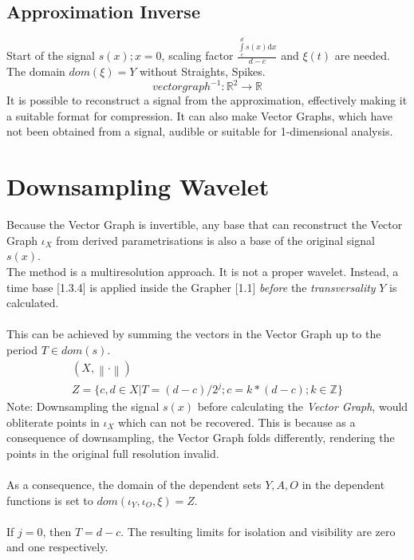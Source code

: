 \documentclass{report}
\newcommand\norm[1]{\left\lVert#1\right\rVert}
\begin{document}
\section{Approximation Inverse}
Start of the signal $s(x);x=0$, scaling factor $\frac{\int \limits _{c}^{d}s(x)\mathrm{d}x}{d-c}$ and $\xi(t)$ are needed. The domain $dom(\xi)=Y$ without Straights, Spikes.
\begin{equation}
vectorgraph^{-1}: \mathbb{R}^2 \rightarrow \mathbb{R}
\end{equation}
It is possible to reconstruct a signal from the approximation, effectively making it a suitable format for compression. It can also make Vector Graphs, which have not been obtained from a signal, audible or suitable for 1-dimensional analysis.

\chapter{Downsampling Wavelet}
Because the Vector Graph is invertible, any base that can reconstruct the Vector Graph $\iota_{X}$ from derived parametrisations is also a base of the original signal $s(x)$.\\
The method is a multiresolution approach. It is not a proper wavelet. Instead, a time base \cite{Mallat}[1.3.4] is applied inside the Grapher \cite{Stopeight}[1.1] \emph{before} the \emph{transversality} $Y$ is calculated.\\\\
This can be achieved by summing the vectors in the Vector Graph up to the period $T \in dom(s)$.
\begin{align}
(X,\norm{\cdot})\\
Z = \{c,d \in X \vert T=(d-c)/2^j;c=k*(d-c);k \in \mathbb{Z}\}
\end{align}
Note: Downsampling the signal $s(x)$ before calculating the \emph{Vector Graph}, would obliterate points in $\iota_{X}$ which can not be recovered. This is because as a consequence of downsampling, the Vector Graph folds differently, rendering the points in the original full resolution invalid.\\\\
As a consequence, the domain of the dependent sets $Y,A,O$ in the dependent functions is set to $dom(\iota_{Y},\iota_{O},\xi)=Z$.\\\\
If $j=0$, then $T=d-c$. The resulting limits for isolation and visibility are zero and one respectively.
\end{document}
